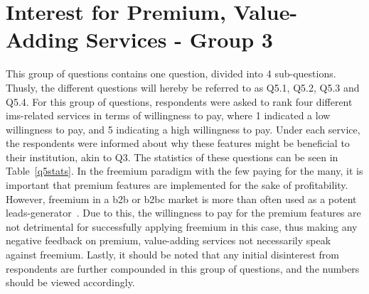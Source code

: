 \section{Interest for Premium, Value-Adding Services - Group 3}
This group of questions contains one question, divided into 4 sub-questions. Thusly, the different questions will hereby be referred to as Q5.1, Q5.2, Q5.3 and Q5.4. For this group of questions, respondents were asked to rank four different \gls{ims}-related services in terms of willingness to pay, where 1 indicated a low willingness to pay, and 5 indicating a high willingness to pay. Under each service, the respondents were informed about why these features might be beneficial to their institution, akin to Q3. The statistics of these questions can be seen in Table~\ref{q5stats}. In the freemium paradigm with the few paying for the many, it is important that premium features are implemented for the sake of profitability. However, freemium in a \gls{b2b} or \gls{b2bc} market is more than often used as a potent leads-generator~\cite{jepson2009freemium}. Due to this, the willingness to pay for the premium features are not detrimental for successfully applying freemium in this case, thus making any negative feedback on premium, value-adding services not necessarily speak against freemium. Lastly, it should be noted that any initial disinterest from respondents are further compounded in this group of questions, and the numbers should be viewed accordingly.

\begin{table}[]
\centering
\caption{Statistics: Question Group 3}
\label{q5stats}
\end{table}


